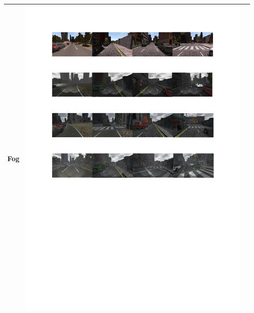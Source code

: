 \documentclass{svproc}
\begin{document}
\begin{table}[!t]
\begin{tabular}{|C{1.5cm}|c|C{8.5cm}|}
	Fog	& \begin{minipage}{.9\textwidth}\includegraphics[scale=.5,trim=2cm 20.5cm 2cm 6.5cm,clip]{examples.pdf}\end{minipage} \\ \hline

\end{tabular}
\end{table}
\end{document}
